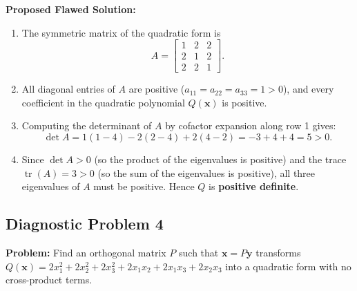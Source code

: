 \documentclass[11pt, letterpaper]{article}
\theoremstyle{definition}
\theoremstyle{remark}
\begin{document}
\textbf{Proposed Flawed Solution:}
\begin{enumerate}
    \item The symmetric matrix of the quadratic form is
    \[
    A = \begin{bmatrix} 1 & 2 & 2 \\ 2 & 1 & 2 \\ 2 & 2 & 1 \end{bmatrix}.
    \]
    \item All diagonal entries of $A$ are positive ($a_{11} = a_{22} = a_{33} = 1 > 0$), and every coefficient in the quadratic polynomial $Q(\mathbf{x})$ is positive.
    \item Computing the determinant of $A$ by cofactor expansion along row 1 gives:
    \[
    \det A = 1(1 - 4) - 2(2 - 4) + 2(4 - 2) = -3 + 4 + 4 = 5 > 0.
    \]
    \item Since $\det A > 0$ (so the product of the eigenvalues is positive) and the trace $\operatorname{tr}(A) = 3 > 0$ (so the sum of the eigenvalues is positive), all three eigenvalues of $A$ must be positive. Hence $Q$ is \textbf{positive definite}.
\end{enumerate}

\hrulefill

\subsection*{Diagnostic Problem 4}
\textbf{Problem:} Find an orthogonal matrix $P$ such that $\mathbf{x} = P\mathbf{y}$ transforms $Q(\mathbf{x}) = 2x_1^2 + 2x_2^2 + 2x_3^2 + 2x_1x_2 + 2x_1x_3 + 2x_2x_3$ into a quadratic form with no cross-product terms.
\end{document}
